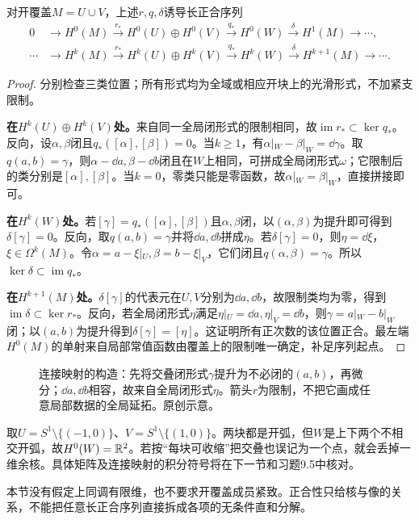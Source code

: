 \begin{theorem}\label{thm:mayer-vietoris}
对开覆盖$M=U\cup V$，上述$r,q,\delta$诱导长正合序列
\begin{align*}
 0&\longrightarrow H^0(M)\xrightarrow{r_*}H^0(U)\oplus H^0(V)
 \xrightarrow{q_*}H^0(W)\xrightarrow{\delta}H^1(M)\longrightarrow\cdots,\\
 \cdots&\longrightarrow H^k(M)\xrightarrow{r_*}H^k(U)\oplus H^k(V)
 \xrightarrow{q_*}H^k(W)\xrightarrow{\delta}H^{k+1}(M)\longrightarrow\cdots.
\end{align*}
\end{theorem}
\begin{proof}
分别检查三类位置；所有形式均为全域或相应开块上的光滑形式，不加紧支限制。

\textbf{在$H^k(U)\oplus H^k(V)$处。}来自同一全局闭形式的限制相同，故$\operatorname{im}r_*\subset\ker q_*$。反向，设$\alpha,\beta$闭且$q_*([\alpha],[\beta])=0$。当$k\geq1$，有$\alpha|_W-\beta|_W=\dd\gamma$。取$q(a,b)=\gamma$，则$\alpha-\dd a,\beta-\dd b$闭且在$W$上相同，可拼成全局闭形式$\omega$；它限制后的类分别是$[\alpha],[\beta]$。当$k=0$，零类只能是零函数，故$\alpha|_W=\beta|_W$，直接拼接即可。

\textbf{在$H^k(W)$处。}若$[\gamma]=q_*([\alpha],[\beta])$且$\alpha,\beta$闭，以$(\alpha,\beta)$为提升即可得到$\delta[\gamma]=0$。反向，取$q(a,b)=\gamma$并将$\dd a,\dd b$拼成$\eta$。若$\delta[\gamma]=0$，则$\eta=\dd\xi$，$\xi\in\Omega^k(M)$。令$\alpha=a-\xi|_U,\beta=b-\xi|_V$，它们闭且$q(\alpha,\beta)=\gamma$。所以$\ker\delta\subset\operatorname{im}q_*$。

\textbf{在$H^{k+1}(M)$处。}$\delta[\gamma]$的代表元在$U,V$分别为$\dd a,\dd b$，故限制类均为零，得到$\operatorname{im}\delta\subset\ker r_*$。反向，若全局闭形式$\eta$满足$\eta|_U=\dd a,\eta|_V=\dd b$，则$\gamma=a|_W-b|_W$闭；以$(a,b)$为提升得到$\delta[\gamma]=[\eta]$。这证明所有正次数的该位置正合。最左端$H^0(M)$的单射来自局部常值函数由覆盖上的限制唯一确定，补足序列起点。
\end{proof}
\begin{figure}[htbp]
\centering
\caption{连接映射的构造：先将交叠闭形式$\gamma$提升为不必闭的$(a,b)$，再微分；$\dd a,\dd b$相容，故来自全局闭形式$\eta$。箭头$r$为限制，不把它画成任意局部数据的全局延拓。原创示意。}
\label{fig:mv-connecting}
\end{figure}

\begin{example}[为什么圆周的交叠必须记住两个分支]
取$U=S^1\setminus\{(-1,0)\}$、$V=S^1\setminus\{(1,0)\}$。两块都是开弧，但$W$是上下两个不相交开弧，故$H^0(W)=\mathbb{R}^2$。若按“每块可收缩”把交叠也误记为一个点，就会丢掉一维余核。具体矩阵及连接映射的积分符号将在下一节和习题9.5中核对。
\end{example}
本节没有假定上同调有限维，也不要求开覆盖成员紧致。正合性只给核与像的关系，不能把任意长正合序列直接拆成各项的无条件直和分解。
